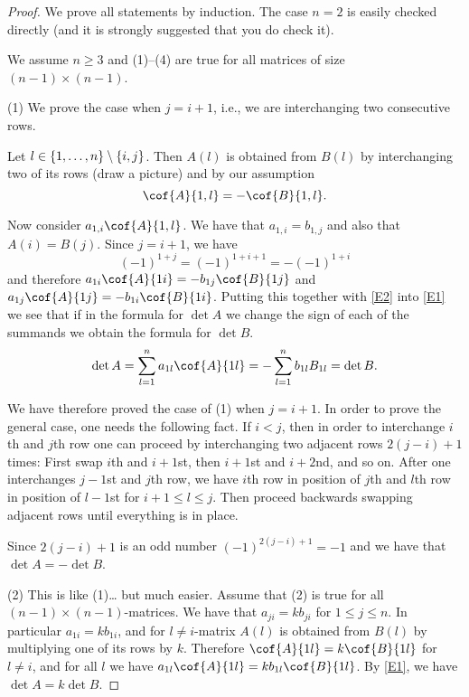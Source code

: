 \begin{proof} 
We prove all statements by induction. The case $n=2$ is easily checked directly (and it is strongly suggested that you do check it). 

We assume $n\geq 3$ and  (1)--(4) are true for all matrices of size $(n-1)\times (n-1)$. 

(1) 
We prove the case when $j=i+1$, i.e., we are interchanging two consecutive rows. 

Let $l\in \left\{1, \dots, n\right\}\setminus \left\{i,j\right\}$. 
Then $A(l)$ is obtained from $B(l)$ by interchanging two of its rows (draw a picture) and 
by our assumption 
\begin{equation} 
\label{E2} 
\cof{A}{1,l}=-\cof{B}{1,l}. 
\end{equation} 

Now consider $a_{1,i} \cof{A}{1,l}$. We have that $a_{1,i}=b_{1,j}$ 
and also that $A(i)=B(j)$. Since $j=i+1$, we have 
\[
(-1)^{1+j}=(-1)^{1+i+1}=-(-1)^{1+i} 
\]
and therefore $a_{1i}\cof{A}{1i}=-b_{1j} \cof{B}{1j}$ and $a_{1j}\cof{A}{1j}=-b_{1i} \cof{B}{1i}$. 
Putting this together with \eqref{E2} into \eqref{E1} we see that if in the formula
for $\det A$ we change the sign of each of the summands we obtain the formula for $\det B$. 
\[
\det A=\sum_{l=1}^n a_{1l}\cof{A}{1l}
=-\sum_{l=1}^n b_{1l} B_{1l}
=\det B. 
\]

We have therefore proved the case of (1) when $j=i+1$. In order to prove the general case, 
one needs the following fact. If $i<j$, then in order to interchange $i$th and $j$th row one 
can proceed by interchanging two adjacent rows $2(j-i)+1$ times: 
First swap $i$th and $i+1$st, then $i+1$st and $i+2$nd, and so on. 
After one interchanges $j-1$st and $j$th row, we have $i$th row in position of $j$th
and $l$th row in position of $l-1$st for $i+1\leq l\leq j$. Then proceed backwards 
swapping adjacent 
rows until everything is in place. 

Since $2(j-i)+1$ is an odd number $(-1)^{2(j-i)+1}=-1$ and 
we have that $\det A=-\det B$. 

(2) This is like (1)\dots{} but much easier. 
Assume that (2) is true for all $(n-1)\times (n-1)$-matrices. 
We have that $a_{ji}=k b_{ji}$ for $1\leq j\leq n$. 
In particular $a_{1i}=kb_{1i}$, and for $l\neq i$-matrix 
$A(l)$ is obtained from $B(l)$ by multiplying one of its rows by $k$. 
Therefore $\cof{A}{1l}=k\cof{B}{1l}$ for $l\neq i$, 
and for all $l$ we have $a_{1l} \cof{A}{1l}=k b_{1l}\cof{B}{1l}$. 
By \eqref{E1}, we have $\det A=k\det B$. 


\end{proof}
